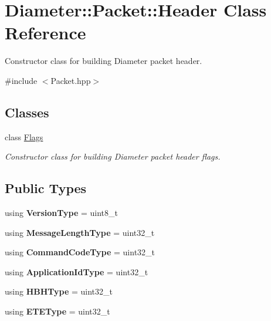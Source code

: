 \hypertarget{classDiameter_1_1Packet_1_1Header}{}\section{Diameter\+:\+:Packet\+:\+:Header Class Reference}
\label{classDiameter_1_1Packet_1_1Header}


Constructor class for building Diameter packet header.  




{\ttfamily \#include $<$Packet.\+hpp$>$}

\subsection*{Classes}
\begin{DoxyCompactItemize}
\item 
class \hyperlink{classDiameter_1_1Packet_1_1Header_1_1Flags}{Flags}
\begin{DoxyCompactList}\small\item\em Constructor class for building Diameter packet header flags. \end{DoxyCompactList}\end{DoxyCompactItemize}
\subsection*{Public Types}
\begin{DoxyCompactItemize}
\item 
\mbox{\label{classDiameter_1_1Packet_1_1Header_aa4f2dd328d0800886b4a27f031f584c9}} 
using {\bfseries Version\+Type} = uint8\+\_\+t
\item 
\mbox{\label{classDiameter_1_1Packet_1_1Header_a7d8368d43a58061237da41a4e1b0b194}} 
using {\bfseries Message\+Length\+Type} = uint32\+\_\+t
\item 
\mbox{\label{classDiameter_1_1Packet_1_1Header_a37fa6422f27e1ec9a10359b8eeebd660}} 
using {\bfseries Command\+Code\+Type} = uint32\+\_\+t
\item 
\mbox{\label{classDiameter_1_1Packet_1_1Header_a02b5a610270b697912707c4da2d1f196}} 
using {\bfseries Application\+Id\+Type} = uint32\+\_\+t
\item 
\mbox{\label{classDiameter_1_1Packet_1_1Header_a6e87aa9b7ae5fb18707fe1ce6bb1fa05}} 
using {\bfseries H\+B\+H\+Type} = uint32\+\_\+t
\item 
\mbox{\label{classDiameter_1_1Packet_1_1Header_af4dbdd16e369dae62b438c1f91515831}} 
using {\bfseries E\+T\+E\+Type} = uint32\+\_\+t
\end{DoxyCompactItemize}
